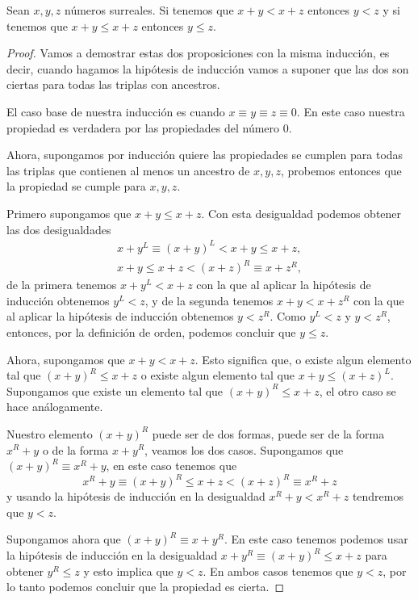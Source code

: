     \begin{theorem}[Cancelaci\'on]
        Sean $x,y, z$ n\'umeros surreales. Si tenemos que $x+y < x+z$ entonces $y < z$ y si tenemos que $x+y\le x+z$ entonces $y\le z$.
    \end{theorem}

    \begin{proof}
        Vamos a demostrar estas dos proposiciones con la misma inducci\'on, es decir, cuando hagamos la hip\'otesis de inducci\'on vamos a suponer que las dos son ciertas para todas las triplas con ancestros.

        El caso base de nuestra inducci\'on es cuando $x\equiv y \equiv z \equiv 0$. En este caso nuestra propiedad es verdadera por las propiedades del n\'umero $0$.

        Ahora, supongamos por inducci\'on quiere las propiedades se cumplen para todas las triplas que contienen al menos un ancestro de $x,y,z$, probemos entonces que la propiedad se cumple para $x,y,z$.

        Primero supongamos que $x+y\le x+z$. Con esta desigualdad podemos obtener las dos desigualdades
        \begin{align*}
            x+y^L \equiv (x+y)^L < x+y \le x + z,\\
            x+y \le x+z < (x+z)^R \equiv x+z^R,
        \end{align*}
        de la primera tenemos $x + y^L < x + z$ con la que al aplicar la hip\'otesis de inducci\'on obtenemos $y^L < z$, y de la segunda tenemos $x+y < x+z^R$ con la que al aplicar la hip\'otesis de inducci\'on obtenemos $y < z^R$. Como $y^L < z$ y $y < z^R$, entonces, por la definici\'on de orden, podemos concluir que $y \le z$.

        Ahora, supongamos que $x+y < x+z$. Esto significa que, o existe algun elemento tal que $(x+y)^R \le x+z$ o existe algun elemento tal que $x+y \le (x+z)^L$. Supongamos que existe un elemento tal que $(x+y)^R \le x+z$, el otro caso se hace an\'alogamente.

        Nuestro elemento $(x+y)^R$ puede ser de dos formas, puede ser de la forma $x^R+y$ o de la forma $x+y^R$, veamos los dos casos. Supongamos que $(x+y)^R\equiv x^R+y$, en este caso tenemos que
        \[
            x^R+y \equiv (x+y)^R \le x+z < (x+z)^R\equiv x^R + z
        \]
        y usando la hip\'otesis de inducci\'on en la desigualdad $x^R+y < x^R + z$ tendremos que $y < z$.

        Supongamos ahora que $(x+y)^R\equiv x+y^R$. En este caso tenemos podemos usar la hip\'otesis de inducci\'on en la desigualdad $x+y^R \equiv (x+y)^R \le x+z$ para obtener $y^R \le z$ y esto implica que $y < z$. En ambos casos tenemos que $y < z$, por lo tanto podemos concluir que la propiedad es cierta.
    \end{proof}

